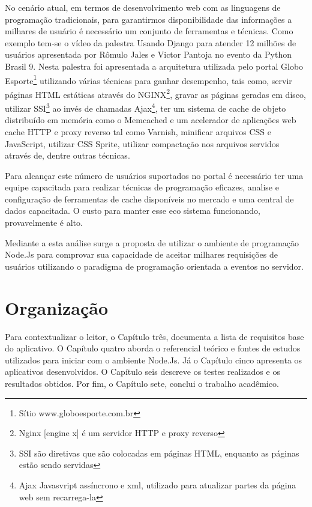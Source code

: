   No cenário atual, em termos de desenvolvimento web com as linguagens de programação tradicionais, 
  para garantirmos disponibilidade das informações a milhares de usuário é necessário um conjunto 
  de ferramentas e técnicas. Como exemplo tem-se o vídeo da palestra Usando Django para atender 12 milhões de usuários 
  apresentada por Rômulo Jales e Victor Pantoja no evento da Python Brasil 9.
  Nesta palestra foi apresentada a arquitetura utilizada pelo portal 
  Globo Esporte\footnote{Sítio www.globoesporte.com.br} utilizando várias técnicas 
  para ganhar desempenho, tais como, servir páginas HTML estáticas através do 
  NGINX\footnote{Nginx [engine x] é um servidor HTTP e proxy reverso}, gravar as páginas geradas em 
  disco, utilizar 
  SSI\footnote{SSI são diretivas que são colocadas em páginas HTML, enquanto as páginas estão sendo servidas} 
  ao invés de chamadas 
  Ajax\footnote{Ajax Javasvript assíncrono e xml, utilizado para atualizar partes da página web sem recarrega-la}, 
  ter um sistema de cache de objeto distribuído em memória   como o Memcached e um acelerador de aplicações web
  cache HTTP e proxy reverso tal como Varnish, minificar  arquivos CSS e JavaScript, utilizar CSS Sprite, utilizar 
  compactação nos arquivos servidos através de, dentre outras técnicas.
  
  Para alcançar este número de usuários suportados no portal é necessário ter uma equipe 
  capacitada para realizar técnicas de programação eficazes, analise e configuração de ferramentas de cache 
  disponíveis no mercado e uma central de dados capacitada. O custo para manter esse eco sistema funcionando,
  provavelmente é alto.
  
  Mediante a esta análise surge a proposta de utilizar o ambiente de programação Node.Js para comprovar sua 
  capacidade de aceitar milhares requisições de usuários utilizando o paradigma de programação orientada a eventos 
  no servidor.
  
\section{Organização}
\label{organizacao}  

  Para contextualizar o leitor, o Capítulo três, documenta a lista de requisitos base do aplicativo. 
  O Capítulo quatro aborda o referencial teórico e fontes de estudos utilizados para iniciar com o ambiente 
  Node.Js. Já o Capítulo cinco apresenta os aplicativos desenvolvidos. O Capítulo seis descreve os testes 
  realizados e os resultados obtidos. Por fim, o Capítulo sete, conclui o trabalho acadêmico.
